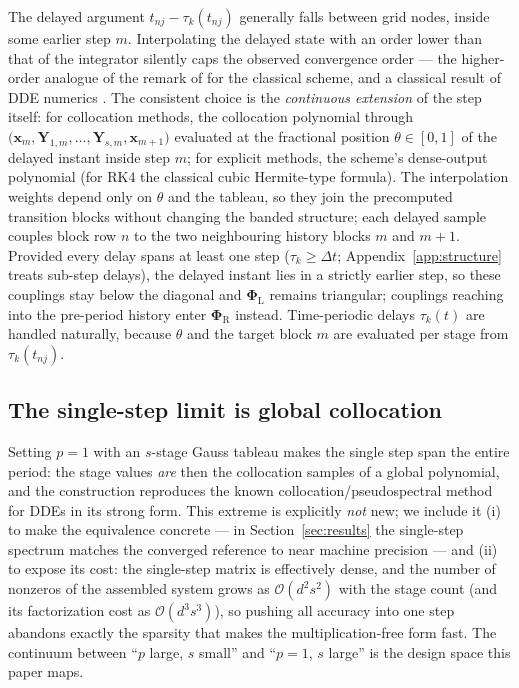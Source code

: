 \documentclass[Afour,sageh,times]{sagej}
\begin{document}
The delayed argument $t_{nj} - \tau_k(t_{nj})$ generally falls between grid
nodes, inside some earlier step $m$. Interpolating the delayed state with an
order lower than that of the integrator silently caps the observed convergence order
--- the higher-order analogue of the remark of \citet{Insperger2008} for the
classical scheme, and a classical result of DDE numerics
\citep{BellenZennaro2003}. The consistent choice is the \emph{continuous
extension} of the step itself: for collocation methods, the collocation
polynomial through $\bigl(\mathbf{x}_m, \mathbf{Y}_{1,m},\ldots,
\mathbf{Y}_{s,m}, \mathbf{x}_{m+1}\bigr)$ evaluated at the fractional
position $\theta \in [0,1]$ of the delayed instant inside step $m$; for
explicit methods, the scheme's dense-output polynomial (for RK4 the classical
cubic Hermite-type formula). The interpolation weights depend only on
$\theta$ and the tableau, so they join the precomputed transition blocks
without changing the banded structure; each delayed sample couples block row
$n$ to the two neighbouring history blocks $m$ and $m+1$. Provided every
delay spans at least one step ($\tau_k \ge \Delta t$;
Appendix~\ref{app:structure} treats sub-step delays), the delayed instant
lies in a strictly earlier step, so these couplings stay below the diagonal
and $\mathbf{\Phi}_\mathrm{L}$ remains
triangular; couplings reaching into the pre-period history enter
$\mathbf{\Phi}_\mathrm{R}$ instead. Time-periodic delays $\tau_k(t)$ are
handled naturally, because $\theta$ and the target block $m$ are evaluated
per stage from $\tau_k(t_{nj})$.

\subsection{The single-step limit is global collocation}
\label{sec:spectral}

Setting $p = 1$ with an $s$-stage Gauss tableau makes the single step span
the entire period: the stage values \emph{are} then the collocation samples
of a global polynomial, and the construction reproduces the known
collocation/pseudospectral method for DDEs \citep{Breda2005,Breda2015} in its
strong form. This extreme is explicitly \emph{not} new; we include it (i) to
make the equivalence concrete --- in Section~\ref{sec:results} the
single-step spectrum matches the converged reference to near machine
precision --- and (ii) to expose its cost: the single-step matrix is
effectively dense, and the number of nonzeros of the assembled system grows
as $\mathcal{O}(d^2 s^2)$ with the stage count (and its factorization cost as
$\mathcal{O}(d^3 s^3)$), so pushing all accuracy into
one step abandons exactly the sparsity that makes the multiplication-free
form fast. The continuum between ``$p$ large, $s$ small'' and ``$p=1$, $s$
large'' is the design space this paper maps.
\end{document}
